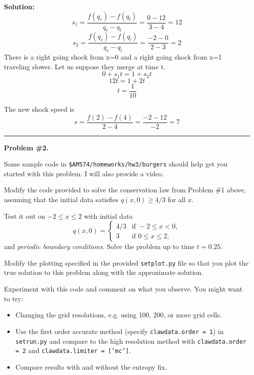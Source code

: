 \documentclass[11pt]{article}
\begin{document}
\vskip 1cm
{\bf Solution:}
\[s_1= \frac{f(q_r)-f(q_l)}{q_r -q_l}= \frac{0-12}{3-4}=12\]
\[s_2= \frac{f(q_r)-f(q_l)}{q_r -q_l}= \frac{-2-0}{2-3}=2\]
There is a right going shock from x=0 and a right going shock from x=1 traveling slower. Let us suppose they merge at time t.
\[0 + s_1 t = 1+ s_2 t \]
\[12 t = 1 + 2 t \]
\[t = \frac{1}{10}\]

The new shock speed is 
\[s=  \frac{f(2)-f(4)}{2 -4}=\frac{-2-12}{-2}=7 \]






\vskip 1cm
\hrule
{\bf Problem \#2.}

Some sample code in \verb+$AM574/homeworks/hw3/burgers+ should help
get you started with this problem.  I will also provide a video.

Modify the code provided to solve the conservation law from Problem \#1
above, assuming that the initial data satisfies $q(x,0) \geq 4/3$ for all
$x$.

Test it out on $-2 \leq x \leq 2$  with initial data
\[
q(x,0) = \begin{cases} 
        4/3 &\text{if~}-2\leq x<0,\\ 
        3 &\text{if~}0\leq x\leq 2,
         \end{cases}
\]
and {\em periodic boundary conditions}.   
Solve the problem up to time $t=0.25$.

Modify the plotting specified in the provided {\tt setplot.py} file so that
you plot the true solution to this problem along with the approximate
solution.


\vskip 5pt
Experiment with this code and comment on what you observe.  You might want
to try:

\begin{itemize}
\item Changing the grid resolutions, e.g. using 100, 200, or more grid cells.

\item Use the first order accurate method (specify {\tt clawdata.order = 1})
in {\tt setrun.py} and compare to the high resolution 
method with {\tt clawdata.order = 2} and {\tt clawdata.limiter = ['mc']}.

\item Compare results with and without the entropy fix.

\end{itemize} 
\end{document}
